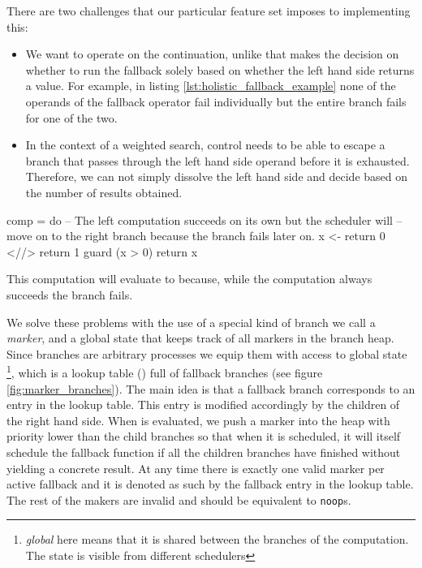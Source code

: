 There are two challenges that our particular feature set imposes to
implementing this:

\begin{itemize}
\item We want \hask{<//>} to operate on the continuation, unlike
  \cite{kiselyovBacktrackingInterleavingTerminating} that makes the
  decision on whether to run the fallback solely based on whether the
  left hand side returns a value. For example, in listing \ref{lst:holistic_fallback_example}
  none of the operands of the fallback operator fail individually
  but the entire branch fails for one of the two.
\item In the context of a weighted search, control needs to be able to
  escape a branch that passes through the left hand side operand
  before it is exhausted. Therefore, we can not simply dissolve the
  left hand side and decide based on the number of results obtained.
\end{itemize}

\begin{code}
\begin{haskellcode}
comp = do
  -- The left computation succeeds on its own  but the scheduler will
  -- move on to the right branch because the branch fails later on.
  x <- return 0 <//> return 1
  guard (x > 0)
  return x
\end{haskellcode}
\caption{\label{lst:holistic_fallback_example}This computation will evaluate to  because, while the computation  always succeeds the branch fails.}
\end{code}

We solve these problems with the use of a special kind of branch we
call a \emph{marker}, and a global state that keeps track of all
markers in the branch heap. Since branches are arbitrary processes we
equip them with access to global state \footnote{\emph{global} here means that it is shared between the branches of the computation. The state is visible from different schedulers},
which is a lookup table () full of fallback branches (see figure
\ref{fig:marker_branches}).  The main idea is that a fallback branch
corresponds to an entry in the lookup table. This entry is modified
accordingly by the children of the right hand side. When \hask{<//>} is evaluated,
we push a marker into the heap with priority lower than the child
branches so that when it is scheduled, it will itself schedule the 
fallback function if all the children branches have finished without yielding a concrete
result. At any time there is exactly one valid marker per active
fallback and it is denoted as such by the fallback entry in the lookup
table. The rest of the makers are invalid and should be equivalent to
\texttt{noop}s.

